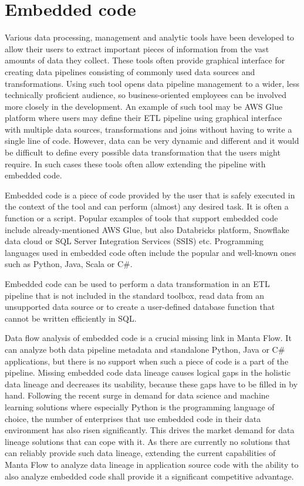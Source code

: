 \section{Embedded code}
Various data processing, management and analytic tools have been developed to allow their users to extract important pieces of information from the vast amounts of data they collect. These tools often provide graphical interface for creating data pipelines consisting of commonly used data sources and transformations. Using such tool opens data pipeline management to a wider, less technically proficient audience, so business-oriented employees can be involved more closely in the development. An example of such tool may be AWS Glue platform where users may define their ETL pipeline using graphical interface with multiple data sources, transformations and joins without having to write a single line of code. However, data can be very dynamic and different and it would be difficult to define every possible data transformation that the users might require. In such cases these tools often allow extending the pipeline with embedded code.
\par
Embedded code is a piece of code provided by the user that is safely executed in the context of the tool and can perform (almost) any desired task. It is often a function or a script. Popular examples of tools that support embedded code include already-mentioned AWS Glue, but also Databricks platform, Snowflake data cloud or SQL Server Integration Services (SSIS) etc. Programming languages used in embedded code often include the popular and well-known ones such as Python, Java, Scala or C\#.
\par
Embedded code can be used to perform a data transformation in an ETL pipeline that is not included in the standard toolbox, read data from an unsupported data source or to create a user-defined database function that cannot be written efficiently in SQL.
\par
Data flow analysis of embedded code is a crucial missing link in Manta Flow. It can analyze both data pipeline metadata and standalone Python, Java or C\# applications, but there is no support when such a piece of code is a part of the pipeline. Missing embedded code data lineage causes logical gaps in the holistic data lineage and decreases its usability, because these gaps have to be filled in by hand. Following the recent surge in demand for data science and machine learning solutions where especially Python is the programming language of choice, the number of enterprises that use embedded code in their data environment has also risen significantly. This drives the market demand for data lineage solutions that can cope with it. As there are currently no solutions that can reliably provide such data lineage, extending the current capabilities of Manta Flow to analyze data lineage in application source code with the ability to also analyze embedded code shall provide it a significant competitive advantage.

